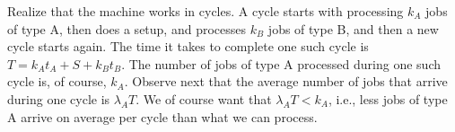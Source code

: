 \begin{exercise}[\faPhoto]
  \begin{solution}
    Realize that the machine works in cycles. A cycle starts with
    processing $k_A$ jobs of type A, then does a setup, and processes
    $k_B$ jobs of type B, and then a new cycle starts again.  The time
    it takes to complete one such cycle is $T=k_A t_A + S + k_B t_B$.
    The number of jobs of type A processed during one such cycle is,
    of course, $k_A$. Observe next that the average number of jobs
    that arrive during one cycle is $\lambda_A T$. We of course want
    that $\lambda_A T< k_A$, i.e., less jobs of type A arrive on
    average per cycle than what we can process.
  \end{solution}
\end{exercise}






